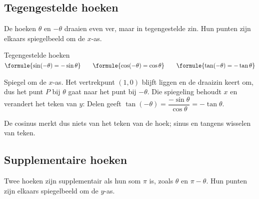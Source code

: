 \subsection{Tegengestelde hoeken}

De hoeken $\theta$ en $-\theta$ draaien even ver, maar in tegengestelde zin. Hun punten zijn elkaars spiegelbeeld om de $x$-as.

\begin{theorie}
\begin{stelling}{Tegengestelde hoeken}
\qquad $\formule{\sin(-\theta) = -\sin\theta} \qquad \formule{\cos(-\theta) = \cos\theta} \qquad \formule{\tan(-\theta) = -\tan\theta}$
\end{stelling}
\begin{bewijs}
Spiegel om de $x$-as. Het vertrekpunt $(1, 0)$ blijft liggen en de draaizin keert om, dus het punt $P$ bij $\theta$ gaat naar het punt bij $-\theta$. Die spiegeling behoudt $x$ en verandert het teken van $y$:
Delen geeft $\tan(-\theta) = \dfrac{-\sin\theta}{\cos\theta} = -\tan\theta$.
\end{bewijs}
\end{theorie}

De cosinus merkt dus niets van het teken van de hoek; sinus en tangens wisselen van teken.


\begin{oefeningen}
\end{oefeningen}

\subsection{Supplementaire hoeken}

Twee hoeken zijn supplementair als hun som $\pi$ is, zoals $\theta$ en $\pi - \theta$. Hun punten zijn elkaars spiegelbeeld om de $y$-as.

